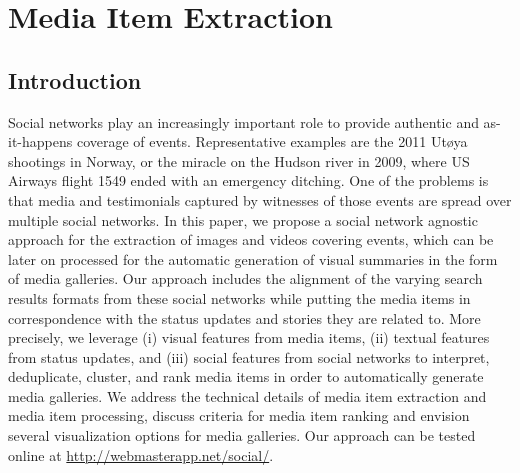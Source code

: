 
\newcommand{\eventtitle}[1]{{\hbox{\strut \textbf{#1}}}}
\newcommand{\thumbheight}{14mm}
\newcommand{\newstrip}{\newline\vspace{-1em}\newline}
\newenvironment{thumbsequence}{}{\makebox[4mm]{}}



\chapter{Media Item Extraction}

\ifpdf
    \graphicspath{{5_media_item_extraction/figures/PNG/}{5_media_item_extraction/figures/PDF/}{5_media_item_extraction/figures/}}
\else
    \graphicspath{{5_media_item_extraction/figures/EPS/}{5_media_item_extraction/figures/}}
\fi



\section{Introduction}                                                      \label{sec:introduction}
Social networks play an increasingly important role to provide authentic and as-it-happens coverage of events.
Representative examples are the 2011 Ut{\o}ya shootings in Norway, or the miracle on the Hudson river in 2009,
where US Airways flight 1549 ended with an emergency ditching. One of the problems is that media and testimonials
captured by witnesses of those events are spread over multiple social networks. In this paper, we propose a social network
agnostic approach for the extraction of images and videos covering events, which can be later on processed for the
automatic generation of visual summaries in the form of media galleries. Our approach includes the alignment of the
varying search results formats from these social networks while putting the media items in correspondence with the
status updates and stories they are related to. More precisely, we leverage (i) visual features from media items,
(ii) textual features from status updates, and (iii) social features from social networks to interpret, deduplicate,
cluster, and rank media items in order to automatically generate media galleries. We address the technical details of media
item extraction and media item processing, discuss criteria for media item ranking and envision several visualization options
for media galleries. Our approach can be tested online at \url{http://webmasterapp.net/social/}.

